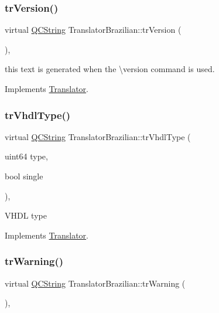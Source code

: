 \subsubsection{\texorpdfstring{trVersion()}{trVersion()}}
{\footnotesize\ttfamily virtual \mbox{\hyperlink{class_q_c_string}{Q\+C\+String}} Translator\+Brazilian\+::tr\+Version (\begin{DoxyParamCaption}{ }\end{DoxyParamCaption})\hspace{0.3cm}{\ttfamily [inline]}, {\ttfamily [virtual]}}

this text is generated when the \textbackslash{}version command is used. 

Implements \mbox{\hyperlink{class_translator}{Translator}}.

\mbox{\label{class_translator_brazilian_a8cfd7c0ac4952835ab2ca311aa32f74e}} 
\subsubsection{\texorpdfstring{trVhdlType()}{trVhdlType()}}
{\footnotesize\ttfamily virtual \mbox{\hyperlink{class_q_c_string}{Q\+C\+String}} Translator\+Brazilian\+::tr\+Vhdl\+Type (\begin{DoxyParamCaption}\item[{uint64}]{type,  }\item[{bool}]{single }\end{DoxyParamCaption})\hspace{0.3cm}{\ttfamily [inline]}, {\ttfamily [virtual]}}

V\+H\+DL type 

Implements \mbox{\hyperlink{class_translator}{Translator}}.

\mbox{\label{class_translator_brazilian_a0df8d947cded269c31eebe27eed02a0c}} 
\subsubsection{\texorpdfstring{trWarning()}{trWarning()}}
{\footnotesize\ttfamily virtual \mbox{\hyperlink{class_q_c_string}{Q\+C\+String}} Translator\+Brazilian\+::tr\+Warning (\begin{DoxyParamCaption}{ }\end{DoxyParamCaption})\hspace{0.3cm}{\ttfamily [inline]}, {\ttfamily [virtual]}}


